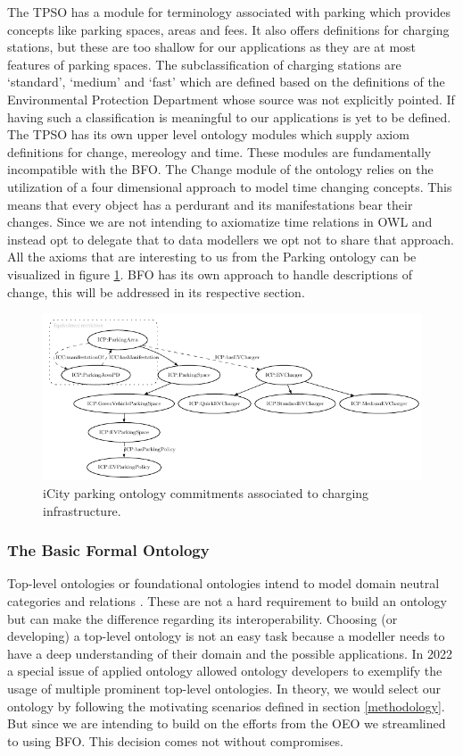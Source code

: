 The TPSO has a module for terminology associated with parking which provides
concepts like parking spaces, areas and fees. It also offers definitions for
charging stations, but these are too shallow for our applications as they are
at most features of parking spaces. The subclassification of charging stations
are `standard', `medium' and `fast' which are defined based on the definitions
of the Environmental Protection Department whose source was not explicitly
pointed. If having such a classification is meaningful to our applications is
yet to be defined. The TPSO has its own upper level ontology modules which
supply axiom definitions for change, mereology and time. These modules are
fundamentally incompatible with the BFO. The Change module of the ontology
relies on the utilization of a four dimensional approach to model time changing
concepts. This means that every object has a perdurant and its manifestations
bear their changes. Since we are not intending to axiomatize time relations in
OWL and instead opt to delegate that to data modellers we opt not to share that
approach. All the axioms that are interesting to us from the Parking ontology
can be visualized in figure \ref{parkingfig}. BFO has its own approach to
handle descriptions of change, this will be addressed in its respective
section.

\begin{figure}[h]
    \centering
    \includegraphics[width=1.0\textwidth]{images/PARKING}
    \caption{iCity parking ontology commitments associated to charging infrastructure.}
    \label{parkingfig}
\end{figure}

\subsubsection{The Basic Formal Ontology}
\label{upperlevel}

Top-level ontologies or foundational ontologies intend to model domain neutral
categories and relations \cite{Arp.2015}. These are not a hard requirement to
build an ontology but can make the difference regarding its interoperability.
Choosing (or developing) a top-level ontology is not an easy task because a
modeller needs to have a deep understanding of their domain and the possible
applications. In 2022 a special issue of applied ontology \cite{Borgo.2022}
allowed ontology developers to exemplify the usage of multiple prominent
top-level ontologies. In theory, we would select our ontology by following the
motivating scenarios defined in section \ref{methodology}. But since we are
intending to build on the efforts from the OEO we streamlined to using BFO.
This decision comes not without compromises. 

